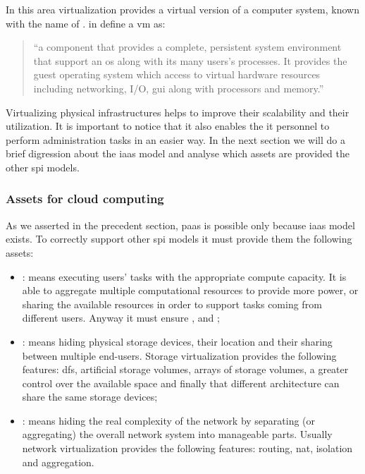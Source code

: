In this area virtualization provides a virtual version of a computer system, known with the name of
. \citeauthor{vmArchitecture} in \cite{vmArchitecture} define a \ac{vm} as:

\begin{quote}
	``a component that provides a complete, persistent system environment that support an \acs{os}
	along with its many users's processes. It provides the guest operating system which access to
	virtual hardware resources including networking, I/O, \ac{gui} along with processors and memory.''
\end{quote}

Virtualizing physical infrastructures helps to improve their scalability and their utilization. It is 
important to notice that it also enables the \acs{it} personnel to perform administration tasks in an
easier way. In the next section we will do a brief digression about the \ac{iaas} model and analyse
which assets are provided the other \ac{spi} models.

\subsubsection{Assets for cloud computing}
\label{sec:background-deployments-virtualization-assets}
As we asserted in the precedent section, \ac{paas} is possible only because \ac{iaas} model exists.
To correctly support other \ac{spi} models it must provide them the following assets:

\begin{itemize}
	\item{: means executing users' tasks with the appropriate compute capacity. It is
		able to aggregate multiple computational resources to provide more power, or sharing the available
		resources in order to support tasks coming from different users. Anyway it must ensure
		,  and ;}
	\item{: means hiding physical storage devices, their location and their sharing between
		multiple end-users. Storage virtualization provides the following features: \ac{dfs},
		artificial storage volumes, arrays of storage volumes, a greater control over the available space and
		finally that different architecture can share the same storage devices;}
	\item{: means hiding the real complexity of the network by separating (or aggregating)
		the overall network system into manageable parts. Usually network virtualization provides the 
		following features: routing, \ac{nat}, isolation and aggregation.}
\end{itemize}

